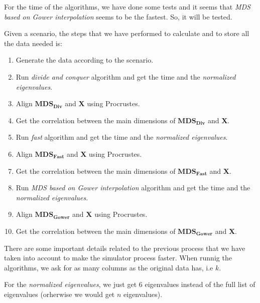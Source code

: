 \documentclass[11pt]{report}
\begin{document}
\indent For the time of the algorithms, we have done some tests and it seems 
that \textit{MDS based on Gower interpolation} seems to be the fastest.
So, it will be tested.


\indent Given a scenario, the steps that we have performed to calculate  and to
store all the data needed is:

\begin{enumerate}

\item Generate the data according to the scenario. 

\item Run \textit{divide and conquer} algorithm and get the time and the 
\textit{normalized eigenvalues}.

\item Align $\mathbf{MDS_{Div}}$ and \textbf{X} using Procrustes.

\item Get the correlation between the main dimensions of $\mathbf{MDS_{Div}}$ 
and \textbf{X}.

\item Run \textit{fast} algorithm and get the time and the 
\textit{normalized eigenvalues}.

\item Align $\mathbf{MDS_{Fast}}$ and \textbf{X} using Procrustes.

\item Get the correlation between the main dimensions of $\mathbf{MDS_{Fast}}$ 
and \textbf{X}.

\item Run \textit{MDS based on Gower interpolation} algorithm and get the 
time and the \textit{normalized eigenvalues}.

\item Align $\mathbf{MDS_{Gower}}$ and \textbf{X} using Procrustes.

\item Get the correlation between the main dimensions of $\mathbf{MDS_{Gower}}$ 
and \textbf{X}.

\end{enumerate}


\indent There are some important details related to the previous process that 
we have taken into account to make the simulator process faster. When runnig 
the algorithms, we ask for as many columns as the original data has, i.e $k$.

\indent For the \textit{normalized eigenvalues}, we just get 6 eigenvalues 
instead of the full list of eigenvalues (orherwise we would get $n$ 
eigenvalues). 
\end{document}

